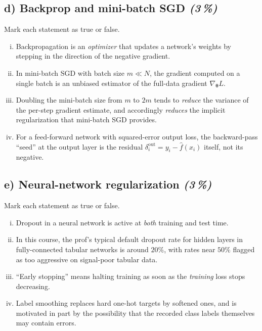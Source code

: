 \documentclass[11pt,a4paper]{article}
\newcommand{\subpoints}[1]{\textit{(#1\,\%)}}
\begin{document}
\subsection*{d) Backprop and mini-batch SGD \subpoints{3}}
Mark each statement as true or false.
\begin{enumerate}[(i)]
  \item Backpropagation is an \emph{optimizer} that updates a network's weights by stepping in the direction of the negative gradient.
  \item In mini-batch SGD with batch size $m \ll N$, the gradient computed on a single batch is an unbiased estimator of the full-data gradient $\nabla_{\boldsymbol\theta} L$.
  \item Doubling the mini-batch size from $m$ to $2m$ tends to \emph{reduce} the variance of the per-step gradient estimate, and accordingly \emph{reduces} the implicit regularization that mini-batch SGD provides.
  \item For a feed-forward network with squared-error output loss, the backward-pass ``seed'' at the output layer is the residual $\delta^{\text{out}}_i = y_i - \hat f(x_i)$ itself, not its negative.
\end{enumerate}

\subsection*{e) Neural-network regularization \subpoints{3}}
Mark each statement as true or false.
\begin{enumerate}[(i)]
  \item Dropout in a neural network is active at \emph{both} training and test time.
  \item In this course, the prof's typical default dropout rate for hidden layers in fully-connected tabular networks is around $20\%$, with rates near $50\%$ flagged as too aggressive on signal-poor tabular data.
  \item ``Early stopping'' means halting training as soon as the \emph{training} loss stops decreasing.
  \item Label smoothing replaces hard one-hot targets by softened ones, and is motivated in part by the possibility that the recorded class labels themselves may contain errors.
\end{enumerate}
\end{document}
